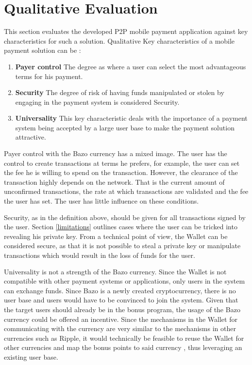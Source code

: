 \section{Qualitative Evaluation}
This section evaluates the developed P2P mobile payment application against key characteristics for such a solution. Qualitative Key characteristics of a mobile payment solution can be \cite{bitcoinmobile}:
\begin{enumerate}
\item \textbf{Payer control}
The degree as where a user can select the most advantageous terms for his payment.
\item \textbf{Security}
The degree of risk of having funds manipulated or stolen by engaging in the payment system is considered Security.
\item \textbf{Universality}
This key characteristic deals with the importance of a payment system being accepted by a large user base to make the payment solution attractive.
\end{enumerate}

Payer control with the Bazo currency has a mixed image.
The user has the control to create transactions at terms he prefers, for example, the user can set the fee he is willing to spend on the transaction. However, the clearance of the transaction highly depends on the network. That is the current amount of unconfirmed transactions, the rate at which transactions are validated and the fee the user has set. The user has little influence on these conditions.

Security, as in the definition above, should be given for all transactions signed by the user. Section \ref{limitations} outlines cases where the user can be tricked into revealing his private key. From a technical point of view, the Wallet can be considered secure, as that it is not possible to steal a private key or manipulate transactions which would result in the loss of funds for the user.

Universality is not a strength of the Bazo currency. Since the Wallet is not compatible with other payment systems or applications, only users in the system can exchange funds. Since Bazo is a newly created cryptocurrency, there is no user base and users would have to be convinced to join the system. Given that the target users should already be in the bonus program, the usage of the Bazo currency could be offered an incentive. Since the mechanisms in the Wallet for communicating with the currency are very similar to the mechanisms in other currencies such as Ripple, it would technically be feasible to reuse the Wallet for other currencies and map the bonus points to said currency \cite{ripplelib}, thus leveraging an existing user base.

